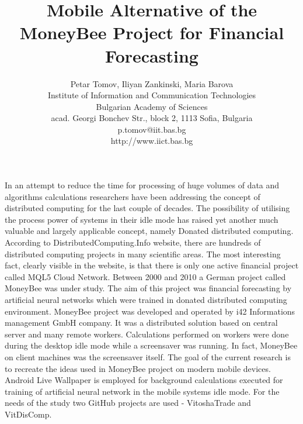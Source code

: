 \documentclass[12pt,a4paper]{article}
\title{\bf Mobile Alternative of the MoneyBee Project for Financial Forecasting}
\author{Petar Tomov, Iliyan Zankinski, Maria Barova \\
Institute of Information and Communication Technologies \\
Bulgarian Academy of Sciences \\
acad. Georgi Bonchev Str., block 2, 1113 Sofia, Bulgaria \\
p.tomov@iit.bas.bg \\
http://www.iict.bas.bg}
\date{}
\begin{document}
\maketitle

In an attempt to reduce the time for processing of huge volumes of data and algorithms calculations researchers have been addressing the concept of distributed computing for the last couple of decades. The possibility of utilising the process power of systems in their idle mode has raised yet another much valuable and largely applicable concept, namely Donated distributed computing. According to DistributedComputing.Info website, there are hundreds of distributed computing projects in many scientific areas. The most interesting fact, clearly visible in the website, is that there is only one active financial project called MQL5 Cloud Network. Between 2000 and 2010 a German project called MoneyBee was under study. The aim of this project was financial forecasting by artificial neural networks which were trained in donated distributed computing environment. MoneyBee project was developed and operated by i42 Informations management GmbH company. It was a distributed solution based on central server and many remote workers. Calculations performed on workers were done during the desktop idle mode while a screensaver was running. In fact, MoneyBee on client machines was the screensaver itself. The goal of the current research is to recreate the ideas used in MoneyBee project on modern mobile devices. Android Live Wallpaper is employed for background calculations executed for training of artificial neural network in the mobile systems idle mode. For the needs of the study two GitHub projects are used - VitoshaTrade and VitDisComp.
\end{document}
